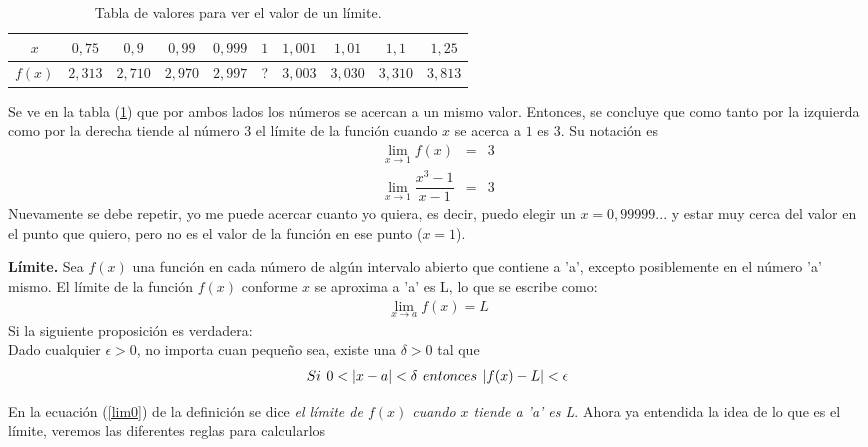 \begin{table}[h!]
\begin{center}
 \begin{tabular}{|c|c|c|c|c|c|c|c|c|c|}
 \hline
 $x$&$0,75$&$0,9$&$0,99$&$0,999$&$1$&$1,001$&$1,01$&$1,1$&$1,25$\\
 \hline
 $f(x)$&$2,313$&$2,710$&$2,970$&$2,997$&?&$3,003$&$3,030$&$3,310$&$3,813$\\
 \hline
 \end{tabular}
 \caption{Tabla de valores para ver el valor de un límite.}
 \label{tablalim}
 \end{center}
\end{table}
Se ve en la tabla (\ref{tablalim}) que por ambos lados los números se acercan a un mismo valor. Entonces, se concluye que como tanto por la izquierda como por la derecha tiende al número $3$ el límite de la función cuando $x$ se acerca a $1$ es $3$. Su notación es
\begin{eqnarray*}
 \lim_{x\to 1 } f(x) &=&3\\
  \lim_{x\to 1 } \dfrac{x^{3}-1}{x-1} &=&3
\end{eqnarray*}
Nuevamente se debe repetir, yo me puede acercar cuanto yo quiera, es decir, puedo elegir un $x=0,99999...$ y estar muy cerca del valor en el punto que quiero, pero no es el valor de la función en ese punto ($x=1$).

\begin{mydef}
\textbf{Límite. }Sea $f(x)$ una función en cada número de algún intervalo abierto que contiene a 'a', excepto posiblemente en el número 'a' mismo. El límite de la función $f(x)$ conforme $x$ se aproxima a 'a' es L, lo que se escribe como: 
\begin{eqnarray}
\lim_{x\rightarrow a}f(x)=L
\label{lim0}
\end{eqnarray}
Si la siguiente proposición es verdadera:\\
Dado cualquier $\epsilon>0$, no importa cuan pequeño sea, existe una $\delta>0$ tal que 
\begin{eqnarray*}
Si \hspace{4px} 0<|x-a|<\delta \hspace{4px} entonces \hspace{4px} |f(x)-L|<\epsilon  
\end{eqnarray*}
\end{mydef}

En la ecuación (\ref{lim0}) de la definición se dice \textit{el límite de $f(x)$ cuando $x$ tiende a 'a' es L}. Ahora ya entendida la idea de lo que es el límite, veremos las diferentes reglas para calcularlos

